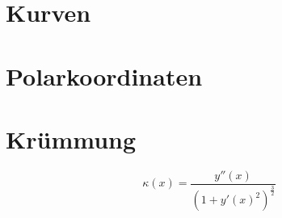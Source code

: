\section{Kurven}
\section{Polarkoordinaten}
\section{Krümmung}
\[ \boxed{\kappa(x) = \frac{y''(x)}{(1 + y'(x)^2)^{\frac{3}{2}}}} \]